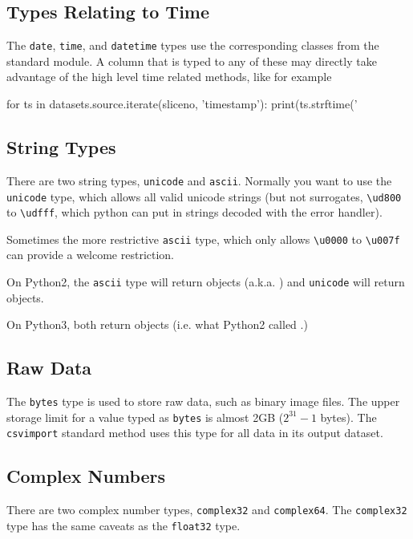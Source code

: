 \subsection{Types Relating to Time}
The \texttt{date}, \texttt{time}, and \texttt{datetime} types use the
corresponding classes from the standard  module. A column that is
typed to any of these may directly take advantage of the high level
time related methods, like for example
\begin{python}
for ts in datasets.source.iterate(sliceno, 'timestamp'):
    print(ts.strftime('%
\end{python}


\subsection{String Types}
There are two string types, \texttt{unicode} and \texttt{ascii}.
Normally you want to use the \texttt{unicode} type, which allows all valid
unicode strings (but not surrogates, \texttt{\textbackslash ud800}
to \texttt{\textbackslash udfff}, which python can put in strings decoded
with the  error handler).

Sometimes the more restrictive \texttt{ascii} type, which only allows
\texttt{\textbackslash u0000} to \texttt{\textbackslash u007f} can
provide a welcome restriction.

On Python2, the \texttt{ascii} type will return  objects
(a.k.a. ) and \texttt{unicode} will return  objects.

On Python3, both return  objects (i.e. what Python2 called
.)


\subsection{Raw Data}

The \texttt{bytes} type is used to store raw data, such as binary
image files.  The upper storage limit for a value typed
as \texttt{bytes} is almost 2GB ($2^{31}-1$ bytes).
The \texttt{csvimport} standard method uses this type for all data in
its output dataset.


\subsection{Complex Numbers}
There are two complex number types, \texttt{complex32}
and \texttt{complex64}.
The \texttt{complex32} type has the same caveats as the \texttt{float32} type.


